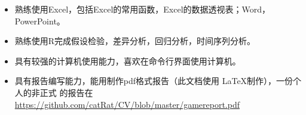 \begin{itemize}
\item 熟练使用Excel，包括Excel的常用函数，Excel的数据透视表；Word，PowerPoint。
\item 熟练使用R完成假设检验，差异分析，回归分析，时间序列分析。
\item 具有较强的计算机使用能力，喜欢在命令行界面使用计算机。
\item 具有报告编写能力，能用制作pdf格式报告（此文档使用 \LaTeX 制作），一份个人的非正式 
的报告在\url{https://github.com/catRat/CV/blob/master/gamereport.pdf}
\end{itemize}
